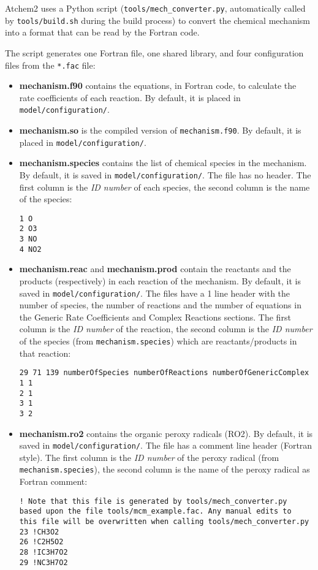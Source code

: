 Atchem2 uses a Python script (\texttt{tools/mech\_converter.py},
automatically called by \texttt{tools/build.sh} during the build
process) to convert the chemical mechanism into a format that can be
read by the Fortran code.

The script generates one Fortran file, one shared library, and four
configuration files from the \texttt{*.fac} file:

\begin{itemize}
\item \textbf{mechanism.f90} contains the equations, in Fortran code,
  to calculate the rate coefficients of each reaction. By default, it
  is placed in \texttt{model/configuration/}.
\item \textbf{mechanism.so} is the compiled version of
  \texttt{mechanism.f90}. By default, it is placed in
  \texttt{model/configuration/}.
\item \textbf{mechanism.species} contains the list of chemical species
  in the mechanism. By default, it is saved in
  \texttt{model/configuration/}. The file has no header. The first
  column is the \emph{ID number} of each species, the second column is
  the name of the species:
\begin{verbatim}
1 O
2 O3
3 NO
4 NO2
\end{verbatim}

\item \textbf{mechanism.reac} and \textbf{mechanism.prod} contain the
  reactants and the products (respectively) in each reaction of the
  mechanism. By default, it is saved in \texttt{model/configuration/}.
  The files have a 1 line header with the number of species, the
  number of reactions and the number of equations in the Generic Rate
  Coefficients and Complex Reactions sections. The first column is the
  \emph{ID number} of the reaction, the second column is the \emph{ID
    number} of the species (from \texttt{mechanism.species}) which are
  reactants/products in that reaction:
\begin{verbatim}
29 71 139 numberOfSpecies numberOfReactions numberOfGenericComplex
1 1
2 1
3 1
3 2
\end{verbatim}

\item \textbf{mechanism.ro2} contains the organic peroxy radicals
  (RO2). By default, it is saved in \texttt{model/configuration/}. The
  file has a comment line header (Fortran style). The first column is
  the \emph{ID number} of the peroxy radical (from
  \texttt{mechanism.species}), the second column is the name of the
  peroxy radical as Fortran comment:
\begin{verbatim}
! Note that this file is generated by tools/mech_converter.py
based upon the file tools/mcm_example.fac. Any manual edits to
this file will be overwritten when calling tools/mech_converter.py
23 !CH3O2
26 !C2H5O2
28 !IC3H7O2
29 !NC3H7O2
\end{verbatim}
\end{itemize}

